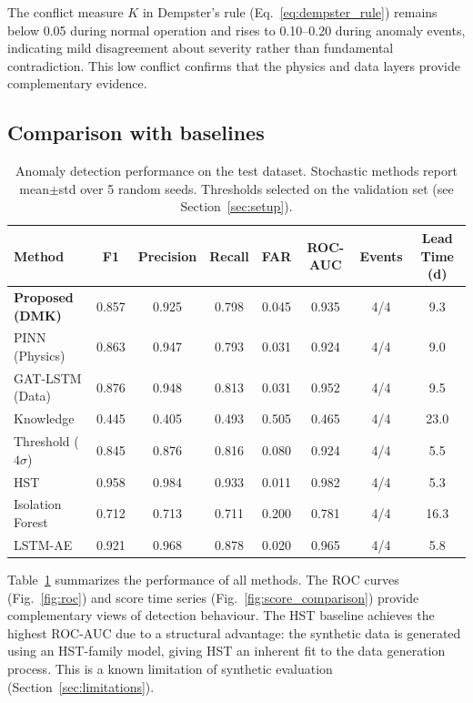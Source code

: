 \documentclass[preprint,12pt,review]{elsarticle}
\begin{document}
The conflict measure $K$ in Dempster's rule (Eq.~\ref{eq:dempster_rule}) remains below 0.05 during normal operation and rises to 0.10--0.20 during anomaly events, indicating mild disagreement about severity rather than fundamental contradiction. This low conflict confirms that the physics and data layers provide complementary evidence.

\subsection{Comparison with baselines}

\begin{table}[htbp]
\centering
\caption{Anomaly detection performance on the test dataset. Stochastic methods report mean$\pm$std over 5 random seeds. Thresholds selected on the validation set (see Section~\ref{sec:setup}).}
\label{tab:results}
\begin{tabular}{lccccccc}
\toprule
Method & F1 & Precision & Recall & FAR & ROC-AUC & Events & Lead Time (d) \\
\midrule
\textbf{Proposed (DMK)} & 0.857 & 0.925 & 0.798 & 0.045 & 0.935 & 4/4 & 9.3 \\
PINN (Physics) & 0.863 & 0.947 & 0.793 & 0.031 & 0.924 & 4/4 & 9.0 \\
GAT-LSTM (Data) & 0.876 & 0.948 & 0.813 & 0.031 & 0.952 & 4/4 & 9.5 \\
Knowledge & 0.445 & 0.405 & 0.493 & 0.505 & 0.465 & 4/4 & 23.0 \\
\midrule
Threshold ($4\sigma$) & 0.845 & 0.876 & 0.816 & 0.080 & 0.924 & 4/4 & 5.5 \\
HST & 0.958 & 0.984 & 0.933 & 0.011 & 0.982 & 4/4 & 5.3 \\
Isolation Forest & 0.712 & 0.713 & 0.711 & 0.200 & 0.781 & 4/4 & 16.3 \\
LSTM-AE & 0.921 & 0.968 & 0.878 & 0.020 & 0.965 & 4/4 & 5.8 \\
\bottomrule
\end{tabular}
\end{table}

Table~\ref{tab:results} summarizes the performance of all methods. The ROC curves (Fig.~\ref{fig:roc}) and score time series (Fig.~\ref{fig:score_comparison}) provide complementary views of detection behaviour. The HST baseline achieves the highest ROC-AUC due to a structural advantage: the synthetic data is generated using an HST-family model, giving HST an inherent fit to the data generation process. This is a known limitation of synthetic evaluation (Section~\ref{sec:limitations}).
\end{document}
